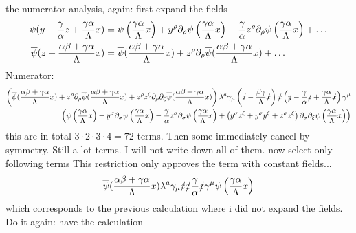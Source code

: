 the numerator analysis, again:
first expand the fields
\begin{align}
	\psi(y - \frac{\gamma}{\alpha}z+ \frac{\gamma \alpha}{\Lambda} x)
	&=
	\psi\left(\frac{\gamma \alpha}{\Lambda} x\right)+y^\rho\partial_\rho \psi\left(\frac{\gamma \alpha}{\Lambda} x\right) - \frac{\gamma}{\alpha}z^\rho\partial_\rho\psi\left(\frac{\gamma \alpha}{\Lambda} x\right) + \dots
	\\
	\overline\psi(z+ \frac{\alpha \beta + \gamma \alpha}{\Lambda} x)
	&=
	\overline\psi(\frac{\alpha \beta + \gamma \alpha}{\Lambda} x) + z^\rho \partial_\rho\overline\psi(\frac{\alpha \beta + \gamma \alpha}{\Lambda} x) + \dots 
\end{align}
Numerator:
\begin{align}
	\left(\overline\psi(\frac{\alpha \beta + \gamma \alpha}{\Lambda} x) + z^\rho \partial_\rho\overline\psi(\frac{\alpha \beta + \gamma \alpha}{\Lambda} x)+z^\rho z^\zeta \partial_\rho\partial_\zeta\overline\psi(\frac{\alpha \beta + \gamma \alpha}{\Lambda} x)\right)
	\lambda^a\gamma_\mu \left( \slashed z - \frac{\beta\gamma}{\Lambda} \slashed x\right) \slashed x \left( \slashed y - \frac{\gamma}{\alpha} \slashed z+ \frac{\gamma\alpha}{\Lambda}\slashed x\right)\gamma^\mu 
	\\
	\left(\psi\left(\frac{\gamma \alpha}{\Lambda} x\right)+y^\sigma\partial_\sigma \psi\left(\frac{\gamma \alpha}{\Lambda} x\right) - \frac{\gamma}{\alpha}z^\sigma\partial_\sigma\psi\left(\frac{\gamma \alpha}{\Lambda} x\right)+\left(y^\sigma z^\xi+y^\sigma y^\xi+z^\sigma z^\xi\right)\partial_\sigma\partial_\xi \psi\left(\frac{\gamma \alpha}{\Lambda} x\right)\right)
\end{align}
this are in total $3\cdot2\cdot3\cdot4=72$ terms. Then some immediately cancel by symmetry. Still a lot terms. I will not write down all of them.
now select only following terms
This restriction only approves the term with constant fields...
\begin{align}
	\overline\psi(\frac{\alpha \beta + \gamma \alpha}{\Lambda} x)
	\lambda^a\gamma_\mu \slashed z \slashed x \frac{\gamma}{\alpha} \slashed z\gamma^\mu 
	\psi\left(\frac{\gamma \alpha}{\Lambda} x\right)
\end{align}
which corresponds to the previous calculation where i did not expand the fields.
Do it again: have the calculation

